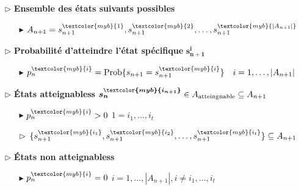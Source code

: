 \documentclass{report}
\begin{document}
\begin{multicols*}{2}
\begin{tikzpicture}
\end{tikzpicture}

\begin{itemize}
    \item [$\rhd$ ] \textbf{Ensemble des états suivants possibles}  
        \begin{itemize}
            \item [$\blacktriangleright$ ] 
                $A_{n+1} =  
                s_{n+1}^{\textcolor{myb}{1}}, 
                s_{n+1}^{\textcolor{myb}{2}}, 
                \dots, s_{n+1}^{\textcolor{myb}{|A_{n+1}|}}$
        \end{itemize}
    \item [$\rhd$ ]                             
        \textbf{Probabilité d'atteindre l'état spécifique} 
        $\boldsymbol{s_{n+1}^{i}}$
        \begin{itemize}
            \item [$\blacktriangleright$ ] 
                $p_n^{\textcolor{myb}{i} } 
                = 
                \text{Prob}\{s_{n+1} 
                = 
        s_{n+1}^{\textcolor{myb}{i}}\} \quad i = 1, \dots, |A_{n+1}|$ 
        \end{itemize}
    \item [$\rhd$ ] 
        \textbf{États atteignabless} 
        $\boldsymbol{s_n^{\textcolor{myb}{i_{n+1}}}} 
        \in A_{\text{atteingnable}} \subseteq A_{n+1}$   
        \begin{itemize}
            \item [$\blacktriangleright$ ] 
                $p_n^{\textcolor{myb}{i} } > 0$ \quad $1 = i_1, \dots, i_t$ 
            \item [$\rhd$ ] 
                $\{
                s_{n+1}^{\textcolor{myb}{i_1}}, 
                s_{n+1}^{\textcolor{myb}{i_2}}, 
                \dots,
                s_{n+1}^{\textcolor{myb}{i_t}}
                \}%
                \subseteq A_{n+1}$
    \end{itemize}
    \item [$\rhd$ ] 
        \textbf{États non atteignabless} 
        \begin{itemize}
            \item [$\blacktriangleright$ ] 
                $p_n^{\textcolor{myb}{i} } 
                = 
                0$ 
                \quad 
                $i = 1, \dots, |A_{n+1}|, i \neq i_1, \dots, i_t$ 
    \end{itemize}
\end{itemize}       


\end{multicols*}
\end{document}
